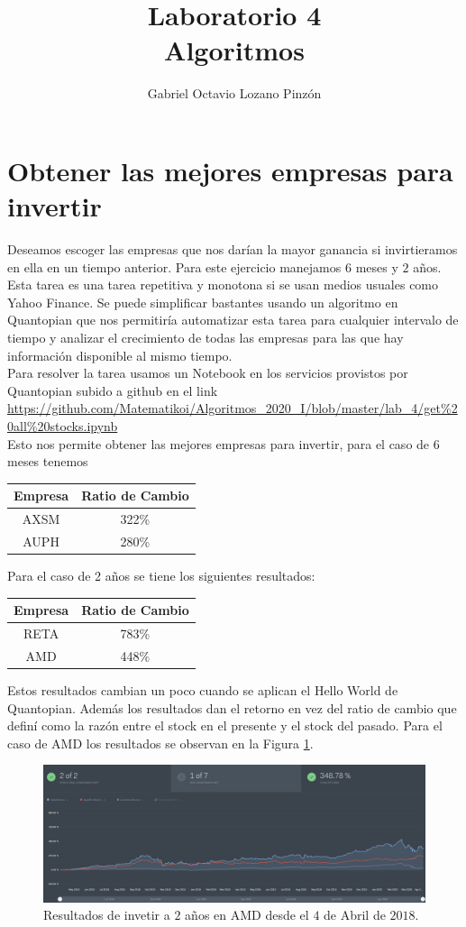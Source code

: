 \documentclass[10pt,a4paper,twocolumn]{article}
\title{Laboratorio 4\\Algoritmos}
\author{Gabriel Octavio Lozano Pinzón}
\begin{document}
	\maketitle
	\section{Obtener las mejores empresas para invertir}	
	Deseamos escoger las empresas que nos darían la mayor ganancia si invirtieramos en ella en un tiempo anterior. Para este ejercicio manejamos $6$ meses y $2$ años. Esta tarea es una tarea repetitiva y monotona si se usan medios usuales como Yahoo Finance. Se puede simplificar bastantes usando un algoritmo en Quantopian que nos permitiría automatizar esta tarea para cualquier intervalo de tiempo y analizar el crecimiento de todas las empresas para las que hay información disponible al mismo tiempo.\\
	Para resolver la tarea usamos un Notebook en los servicios provistos por Quantopian subido a github en el link \url{https://github.com/Matematikoi/Algoritmos_2020_I/blob/master/lab_4/get%20all%20stocks.ipynb}\\
		Esto nos permite obtener las mejores empresas para invertir, para el caso de 6 meses tenemos
		\begin{center}
			\begin{tabular}{ |c|c| } 
				\hline
				Empresa & Ratio de Cambio\\
				\hline
				AXSM & 322\%\\ 
				AUPH & 280\%\\ 
				\hline
			\end{tabular}
		\end{center}
		Para el caso de 2 años se tiene los siguientes resultados: 
		\begin{center}
			\begin{tabular}{ |c|c| } 
				\hline
				Empresa & Ratio de Cambio\\
				\hline
				RETA & 783\%\\ 
				AMD & 448\%\\ 
				\hline
			\end{tabular}
		\end{center}
		Estos resultados cambian un poco cuando se aplican el Hello World de Quantopian. Además los resultados dan el retorno en vez del ratio de cambio que definí como la razón entre el stock en el presente y el stock del pasado. Para el caso de AMD los resultados se observan en la Figura \ref{fig:amd}.
		\begin{figure}
			\centering
			\includegraphics[width=1.0\linewidth]{amd.png}
			\caption{Resultados de invetir a $2$ años en AMD desde el $4$ de Abril de $2018$.}
			\label{fig:amd}
		\end{figure}
\end{document}
